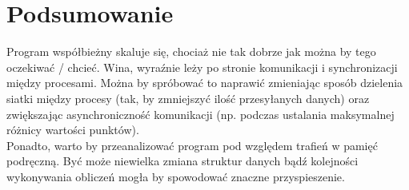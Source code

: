 \documentclass[paper=a4, fontsize=11pt]{scrartcl}	%
\numberwithin{equation}{section}		%
\numberwithin{figure}{section}			%
\numberwithin{table}{section}				%
\begin{document}
\section{Podsumowanie}

Program współbieżny skaluje się, chociaż nie tak dobrze jak można by tego
oczekiwać / chcieć. Wina, wyraźnie leży po stronie komunikacji i synchronizacji
między procesami. Można by spróbować to naprawić zmieniając sposób dzielenia
siatki między procesy (tak, by zmniejszyć ilość przesyłanych danych) oraz
zwiększając asynchroniczność komunikacji (np. podczas ustalania maksymalnej
różnicy wartości punktów). \\

Ponadto, warto by przeanalizować program pod względem trafień w pamięć
podręczną. Być może niewielka zmiana struktur danych bądź kolejności wykonywania
obliczeń mogła by spowodować znaczne przyspieszenie.

\end{document}
